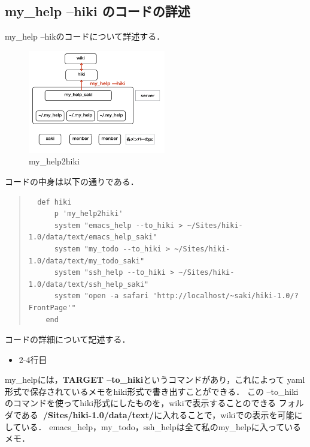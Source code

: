 \newpage

\subsection{my\_help --hiki のコードの詳述}
my\_help --hikのコードについて詳述する．

\begin{figure}[htbp]\begin{center}
\includegraphics[width=6cm,bb=100 100 600 800]{my_help2hiki_saki.013.png}
\caption{my\_help2hiki}
\label{default}\end{center}\end{figure}

コードの中身は以下の通りである．
\begin{quote}\begin{verbatim}
  def hiki
      p 'my_help2hiki'
      system "emacs_help --to_hiki > ~/Sites/hiki-1.0/data/text/emacs_help_saki"
      system "my_todo --to_hiki > ~/Sites/hiki-1.0/data/text/my_todo_saki"
      system "ssh_help --to_hiki > ~/Sites/hiki-1.0/data/text/ssh_help_saki"
      system "open -a safari 'http://localhost/~saki/hiki-1.0/?FrontPage'"
    end
\end{verbatim}\end{quote}
\newpage
コードの詳細について記述する．
\begin{itemize}
\item 2-4行目
\end{itemize}
\begin{description}
\item my\_helpには，\textbf{TARGET --to\_hiki}というコマンドがあり，これによって
yaml形式で保存されているメモをhiki形式で書き出すことができる．
この --to\_hiki のコマンドを使ってhiki形式にしたものを，wikiで表示することのできる
フォルダである\textbf{~/Sites/hiki-1.0/data/text/}に入れることで，wikiでの表示を可能にしている．
emacs\_help，my\_todo，ssh\_helpは全て私のmy\_helpに入っているメモ．
\end{description}

